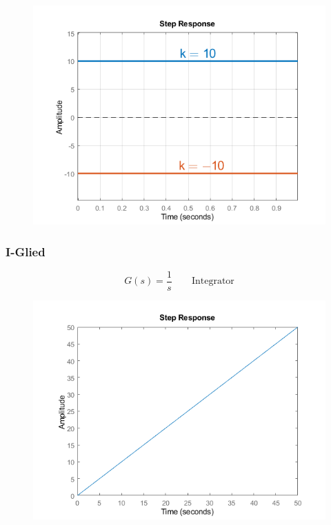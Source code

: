 \documentclass[
  10pt,
  a4paper,
  twocolumn]{article}
\numberwithin{equation}{section}
\begin{document}
\begin{figure}[H]

{\centering \includegraphics{images/paste-23.png}

}

\end{figure}

\hypertarget{i-glied}{%
\subsubsection{I-Glied}\label{i-glied}}

\[
G(s)=\frac1{s}\qquad\text{Integrator}
\]

\begin{figure}[H]

{\centering \includegraphics{images/paste-22.png}

}

\end{figure}
\end{document}

